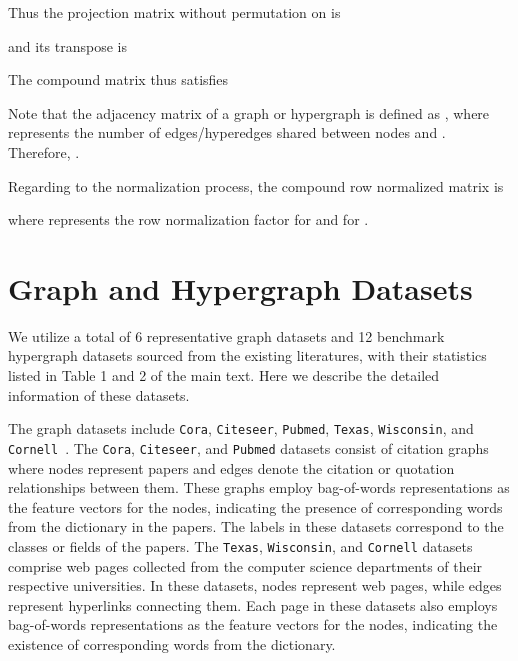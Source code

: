 \documentclass[review]{elsarticle}
\begin{document}
Thus the projection matrix without permutation on  is

and its transpose is

The compound matrix thus satisfies

Note that the adjacency matrix  of a graph or hypergraph is defined as , where  represents the number of edges/hyperedges shared between nodes  and . Therefore, .

Regarding to the normalization process, the compound row normalized matrix is

where  represents the row normalization factor for  and  for .

\section{Graph and Hypergraph Datasets}

We utilize a total of 6 representative graph datasets and 12 benchmark hypergraph datasets sourced from the existing literatures, with their statistics listed in Table 1 and 2 of the main text. Here we describe the detailed information of these datasets.

The graph datasets include \texttt{Cora}, \texttt{Citeseer}, \texttt{Pubmed}, \texttt{Texas}, \texttt{Wisconsin}, and \texttt{Cornell}~\cite{pei2020geom}. The \texttt{Cora}, \texttt{Citeseer}, and \texttt{Pubmed} datasets consist of citation graphs where nodes represent papers and edges denote the citation or quotation relationships between them. These graphs employ bag-of-words representations as the feature vectors for the nodes, indicating the presence of corresponding words from the dictionary in the papers. The labels in these datasets correspond to the classes or fields of the papers. The \texttt{Texas}, \texttt{Wisconsin}, and \texttt{Cornell} datasets comprise web pages collected from the computer science departments of their respective universities. In these datasets, nodes represent web pages, while edges represent hyperlinks connecting them. Each page in these datasets also employs bag-of-words representations as the feature vectors for the nodes, indicating the existence of corresponding words from the dictionary.
\end{document}
